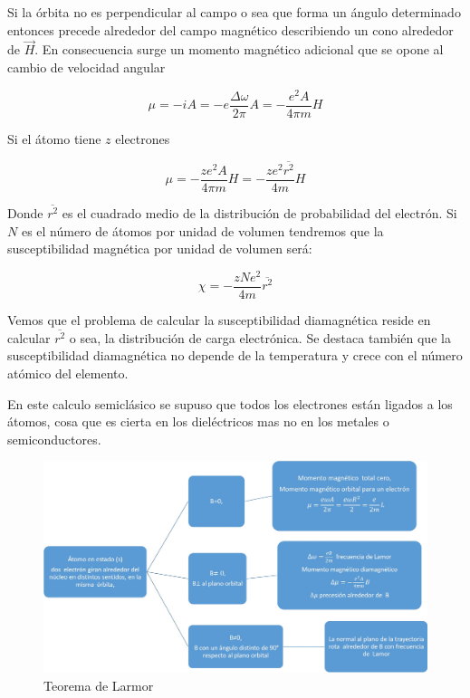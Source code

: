Si la órbita no es perpendicular al campo o sea que forma un ángulo determinado entonces precede alrededor del campo magnético describiendo un cono alrededor de $\overrightarrow{H}$. En consecuencia surge un momento magnético adicional que se opone al cambio de velocidad angular

\begin{equation}
  \mu= -iA = -e \frac{\Delta\omega}{2\pi}A = -\frac{e^{2}A}{4\pi m} H
\end{equation}

Si el átomo tiene $z$ electrones

\begin{equation}
  \mu= -\frac{z e^{2}A}{4\pi m} H = -\frac{z e^{2} \overline{r^{2}}}{4m} H
\end{equation}

Donde $\overline{r^{2}}$ es el cuadrado medio de la distribución de probabilidad del electrón. Si $N$ es el número de átomos por unidad de volumen tendremos que la susceptibilidad magnética por unidad de volumen será:

\begin{equation}
  \chi= -\frac{z N e^{2}}{4m} \overline{r^{2}}
\end{equation}

Vemos que el problema de calcular la susceptibilidad diamagnética reside en calcular $\overline{r^{2}}$ o sea, la distribución de carga electrónica. Se destaca también que la susceptibilidad diamagnética no depende de la temperatura y crece con el número atómico del elemento.

En este calculo semiclásico se supuso que todos los electrones están ligados a los átomos, cosa que es cierta en los dieléctricos mas no en los metales o semiconductores.

\begin{figure}[H]
    \centering
    \includegraphics[width=1.0\textwidth]{./Figures/fig_s11}
	\caption{Teorema de Larmor}
	\label{fig:s11}
\end{figure}

